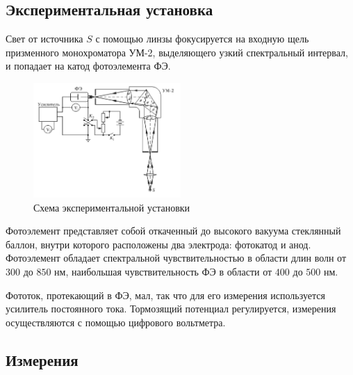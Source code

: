 \subsection*{Экспериментальная установка}


Свет от источника $S$ с помощью линзы фокусируется на входную щель призменного монохроматора УМ-2, выделяющего узкий спектральный интервал, и попадает на катод фотоэлемента ФЭ.
\begin{figure}[h]
    \centering
    \includegraphics[width=0.5\textwidth]{imgs/exp.png}
    \caption{Схема экспериментальной установки}
    \label{fig:exp}
\end{figure}
Фотоэлемент представляет собой откаченный до высокого вакуума стеклянный баллон, внутри которого расположены два электрода: фотокатод и анод. Фотоэлемент обладает спектральной чувствительностью в области длин волн от $300$ до $850$ нм, наибольшая чувствительность ФЭ в области от $400$ до $500$ нм. 

Фототок, протекающий в ФЭ, мал, так что для его измерения используется усилитель постоянного тока. Тормозящий потенциал регулируется, измерения осуществляются с помощью цифрового вольтметра.




\subsection*{Измерения}


